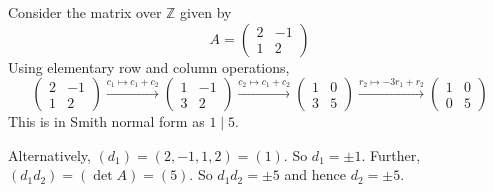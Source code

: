 \begin{example}
	Consider the matrix over \( \mathbb Z \) given by
	\[ A = \begin{pmatrix}
		2 & -1 \\
		1 & 2
	\end{pmatrix} \]
	Using elementary row and column operations,
	\[ \begin{pmatrix}
		2 & -1 \\
		1 & 2
	\end{pmatrix} \xrightarrow{c_1 \mapsto c_1 + c_2} \begin{pmatrix}
		1 & -1 \\
		3 & 2
	\end{pmatrix} \xrightarrow{c_2 \mapsto c_1 + c_2} \begin{pmatrix}
		1 & 0 \\
		3 & 5
	\end{pmatrix} \xrightarrow{r_2 \mapsto -3r_1 + r_2} \begin{pmatrix}
		1 & 0 \\
		0 & 5
	\end{pmatrix} \]
	This is in Smith normal form as \( 1 \mid 5 \).

	Alternatively, \( (d_1) = (2, -1, 1, 2) = (1) \).
	So \( d_1 = \pm 1 \).
	Further, \( (d_1 d_2) = (\det A) = (5) \).
	So \( d_1 d_2 = \pm 5 \) and hence \( d_2 = \pm 5 \).
\end{example}

